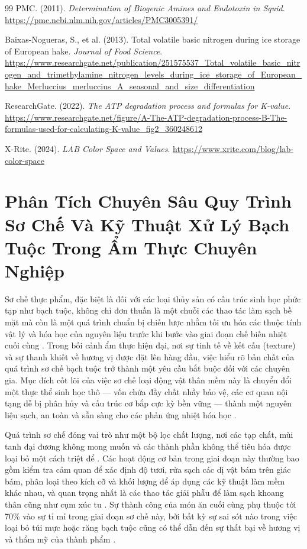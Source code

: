\documentclass[12pt,a4paper]{report}
\begin{document}
\begin{thebibliography}{99}
 PMC. (2011). \textit{Determination of Biogenic Amines and Endotoxin in Squid}. \url{https://pmc.ncbi.nlm.nih.gov/articles/PMC3005391/}

 Baixas-Nogueras, S., et al. (2013). Total volatile basic nitrogen during ice storage of European hake. \textit{Journal of Food Science}. \url{https://www.researchgate.net/publication/251575537_Total_volatile_basic_nitrogen_and_trimethylamine_nitrogen_levels_during_ice_storage_of_European_hake_Merluccius_merluccius_A_seasonal_and_size_differentiation}

 ResearchGate. (2022). \textit{The ATP degradation process and formulas for K-value}. \url{https://www.researchgate.net/figure/A-The-ATP-degradation-process-B-The-formulas-used-for-calculating-K-value_fig2_360248612}

 X-Rite. (2024). \textit{LAB Color Space and Values}. \url{https://www.xrite.com/blog/lab-color-space}

\end{thebibliography}

\chapter{Phân Tích Chuyên Sâu Quy Trình Sơ Chế Và Kỹ Thuật Xử Lý Bạch Tuộc Trong Ẩm Thực Chuyên Nghiệp}

Sơ chế thực phẩm, đặc biệt là đối với các loại thủy sản có cấu trúc sinh học phức tạp như bạch tuộc, không chỉ đơn thuần là một chuỗi các thao tác làm sạch bề mặt mà còn là một quá trình chuẩn bị chiến lược nhằm tối ưu hóa các thuộc tính vật lý và hóa học của nguyên liệu trước khi bước vào giai đoạn chế biến nhiệt cuối cùng \cite{ref1}. Trong bối cảnh ẩm thực hiện đại, nơi sự tinh tế về kết cấu (texture) và sự thanh khiết về hương vị được đặt lên hàng đầu, việc hiểu rõ bản chất của quá trình sơ chế bạch tuộc trở thành một yêu cầu bắt buộc đối với các chuyên gia. Mục đích cốt lõi của việc sơ chế loại động vật thân mềm này là chuyển đổi một thực thể sinh học thô — vốn chứa đầy chất nhầy bảo vệ, các cơ quan nội tạng dễ bị phân hủy và cấu trúc cơ bắp cực kỳ bền vững — thành một nguyên liệu sạch, an toàn và sẵn sàng cho các phản ứng nhiệt hóa học \cite{ref1}.

Quá trình sơ chế đóng vai trò như một bộ lọc chất lượng, nơi các tạp chất, mùi tanh đại đương không mong muốn và các thành phần không thể tiêu hóa được loại bỏ một cách triệt để \cite{ref2}. Các hoạt động cơ bản trong giai đoạn này thường bao gồm kiểm tra cảm quan để xác định độ tươi, rửa sạch các dị vật bám trên giác bám, phân loại theo kích cỡ và khối lượng để áp dụng các kỹ thuật làm mềm khác nhau, và quan trọng nhất là các thao tác giải phẫu để làm sạch khoang thân cũng như cụm xúc tu \cite{ref1}. Sự thành công của món ăn cuối cùng phụ thuộc tới 70\% vào sự tỉ mỉ trong giai đoạn sơ chế này, bởi bất kỳ sự sai sót nào trong việc loại bỏ túi mực hoặc răng bạch tuộc cũng có thể dẫn đến sự thất bại về hương vị và thẩm mỹ của thành phẩm \cite{ref3}.
\end{document}
